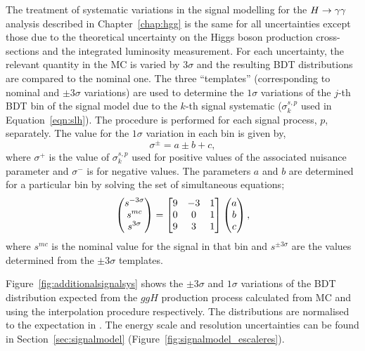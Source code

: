 The treatment of systematic variations in the signal modelling for the $H\rightarrow\gamma\gamma$ analysis described in 
Chapter~\ref{chap:hgg} is the same for all uncertainties except those due to the 
theoretical uncertainty on the Higgs boson production cross-sections and the integrated luminosity measurement.
For each uncertainty, the relevant quantity in the MC is varied by 3$\sigma$ and the 
resulting BDT distributions are compared to the nominal one. The three ``templates'' (corresponding to
nominal and $\pm3\sigma$ variations) are used to determine the $1\sigma$ variations of the $j$-th BDT bin 
of the signal model due to the $k$-th signal systematic ($\sigma_{k}^{s,p}$ used in Equation~\ref{eqn:slh}).
The procedure is performed for each signal process, $p$, separately.
The value for the $1\sigma$ variation in each bin is given by,
\begin{equation}
  \sigma^{\pm} = a \pm b + c,
\end{equation}
where $\sigma^{+}$ is the value of $\sigma_{k}^{s,p}$ used for positive values of the 
associated nuisance parameter and $\sigma^{-}$ is for negative values.
The parameters $a$ and $b$ are determined for a particular bin by solving the set of simultaneous equations;
\begin{equation}
\everymath{\displaystyle}\begin{pmatrix} 
s^{-3\sigma} \\ s^{mc}  \\ s^{3\sigma}
\end{pmatrix}
=
\begin{bmatrix}
9 & -3 & 1 \\
0 & 0  & 1 \\
9 & 3  & 1
\end{bmatrix}
\begin{pmatrix} a \\ b \\ c 
\end{pmatrix},
\end{equation}
where $s^{mc}$ is the nominal value for the signal in that bin and $s^{\pm 3\sigma}$ are the values
determined from the  $\pm 3\sigma$ templates.

Figure~\ref{fig:additionalsignalsys} shows the $\pm3\sigma$ and $1\sigma$ variations
of the BDT distribution expected from the $ggH$ production process calculated from
MC and using the interpolation procedure respectively. The distributions are normalised to the expectation
in \clumi. The energy scale and resolution uncertainties can be found in Section~\ref{sec:signalmodel}
(Figure~\ref{fig:signalmodel_escaleres}).

